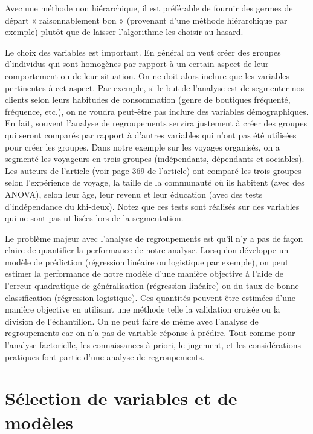 \documentclass[
  11pt,
  letterpaper,
]{book}
\theoremstyle{definition}
\theoremstyle{definition}
\theoremstyle{definition}
\theoremstyle{remark}
\begin{document}
Avec une méthode non hiérarchique, il est préférable de fournir des germes de départ « raisonnablement bon » (provenant d'une méthode hiérarchique par exemple) plutôt que de laisser l'algorithme les choisir au hasard.

Le choix des variables est important. En général on veut créer des groupes d'individus qui sont homogènes par rapport à un certain aspect de leur comportement ou de leur situation. On ne doit alors inclure que les variables pertinentes à cet aspect. Par exemple, si le but de l'analyse est de segmenter nos clients selon leurs habitudes de consommation (genre de boutiques fréquenté, fréquence, etc.), on ne voudra peut-être pas inclure des variables démographiques. En fait, souvent l'analyse de regroupements servira justement à créer des groupes qui seront comparés par rapport à d'autres variables qui n'ont pas été utilisées pour créer les groupes. Dans notre exemple sur les voyages organisés, on a segmenté les voyageurs en trois groupes (indépendants, dépendants et sociables). Les auteurs de l'article (voir page 369 de l'article) ont comparé les trois groupes selon l'expérience de voyage, la taille de la communauté où ils habitent (avec des ANOVA), selon leur âge, leur revenu et leur éducation (avec des tests d'indépendance du khi-deux). Notez que ces tests sont réalisés sur des variables qui ne sont pas utilisées lors de la segmentation.

Le problème majeur avec l'analyse de regroupements est qu'il n'y a pas de façon claire de quantifier la performance de notre analyse. Lorsqu'on développe un modèle de prédiction (régression linéaire ou logistique par exemple), on peut estimer la performance de notre modèle d'une manière objective à l'aide de l'erreur quadratique de généralisation (régression linéaire) ou du taux de bonne classification (régression logistique). Ces quantités peuvent être estimées d'une manière objective en utilisant une méthode telle la validation croisée ou la division de l'échantillon. On ne peut faire de même avec l'analyse de regroupements car on n'a pas de variable réponse à prédire. Tout comme pour l'analyse factorielle, les connaissances à priori, le jugement, et les considérations pratiques font partie d'une analyse de regroupements.

\hypertarget{selection-modele}{%
\chapter{Sélection de variables et de modèles}\label{selection-modele}}
\end{document}
